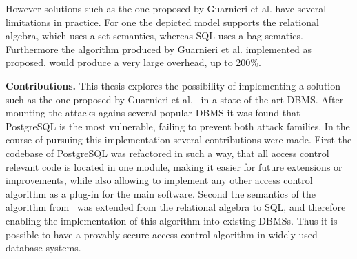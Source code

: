 However solutions such as the one proposed by Guarnieri et al. have several limitations in practice.
%
For one the depicted model supports the relational algebra, which uses a set semantics, whereas SQL uses a bag sematics.
%
Furthermore the algorithm produced by Guarnieri et al. implemented as proposed, would produce a very large overhead, up to 200\%.
%



\smallskip
\noindent
{\bf Contributions.}
This thesis explores the possibility of implementing a solution such as the one proposed by Guarnieri et al.~\cite{guarnieri2016strong} in a state-of-the-art DBMS.
%
After mounting the attacks agains several popular DBMS it was found that PostgreSQL is the most vulnerable, failing to prevent both attack families.
%
In the course of pursuing this implementation several contributions were made.
%
First the codebase of PostgreSQL was refactored in such a way, that all access control relevant code is located in one module, making it easier for future extensions or improvements, while also allowing to implement any other access control algorithm as a plug-in for the main software.
%
Second the semantics of the algorithm from~\cite{guarnieri2016strong} was extended from the relational algebra to SQL, and therefore enabling the implementation of this algorithm into existing DBMSs. Thus it is possible to have a provably secure access control algorithm in widely used database systems.

%


